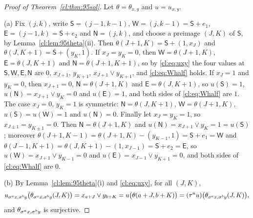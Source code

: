 \begin{proof}[Proof of Theorem~\ref{cl:thm:95sol}]
Let $\theta=\theta_{x,y}$ and $u=u_{x,y}$.

(a) Fix $(j,k)$, write $\mathsf S=(j-1,k-1)$, $\mathsf W=(j,k-1)=\mathsf S+e_1$, $\mathsf E=(j-1,k)=\mathsf S+e_2$ and $\mathsf N=(j,k)$, and choose a preimage $(J,K)$ of $\mathsf S$, by Lemma~\ref{cl:lem:95theta}(ii). Then $\theta(J+1,K)=\mathsf S+(1,x_J)$ and $\theta(J,K+1)=\mathsf S+(y_K,1)$. If $x_J=y_K=0$, then $\mathsf W=\theta(J+1,K)$, $\mathsf E=\theta(J,K+1)$ and $\mathsf N=\theta(J+1,K+1)$, so by \eqref{cl:eq:uxy} the four values at $\mathsf S,\mathsf W,\mathsf E,\mathsf N$ are $0$, $x_{J+1}$, $y_{K+1}$, $x_{J+1}\vee y_{K+1}$, and \eqref{cl:eq:Whalf} holds. If $x_J=1$ and $y_K=0$, then $x_{J+1}=0$, $\mathsf N=\theta(J+1,K)$ and $\mathsf E=\theta(J,K+1)$, so $u(\mathsf S)=1$, $u(\mathsf N)=x_{J+1}\vee y_K=0$ and $u(\mathsf E)=1$, and both sides of \eqref{cl:eq:Whalf} are $1$. The case $x_J=0$, $y_K=1$ is symmetric: $\mathsf N=\theta(J,K+1)$, $\mathsf W=\theta(J+1,K)$, $u(\mathsf S)=u(\mathsf W)=1$ and $u(\mathsf N)=0$. Finally let $x_J=y_K=1$, so $x_{J\pm1}=y_{K\pm1}=0$. Then $\mathsf N=\theta(J+1,K)$ and $u(\mathsf N)=x_{J+1}\vee y_K=1=u(\mathsf S)$; moreover $\theta(J+1,K-1)=\theta(J+1,K)-(y_{K-1},1)=\mathsf S+e_1=\mathsf W$ and $\theta(J-1,K+1)=\theta(J,K+1)-(1,x_{J-1})=\mathsf S+e_2=\mathsf E$, so $u(\mathsf W)=x_{J+1}\vee y_{K-1}=0$ and $u(\mathsf E)=x_{J-1}\vee y_{K+1}=0$, and both sides of \eqref{cl:eq:Whalf} are $0$.

(b) By Lemma~\ref{cl:lem:95theta}(i) and \eqref{cl:eq:uxy}, for all $(J,K)$,
\[
u_{\sigma^ax,\sigma^by}\bigl(\theta_{\sigma^ax,\sigma^by}(J,K)\bigr)=x_{a+J}\vee y_{b+K}=u\bigl(\theta(a+J,b+K)\bigr)=(\tau^nu)\bigl(\theta_{\sigma^ax,\sigma^by}(J,K)\bigr),
\]
and $\theta_{\sigma^ax,\sigma^by}$ is surjective.


\end{proof}
